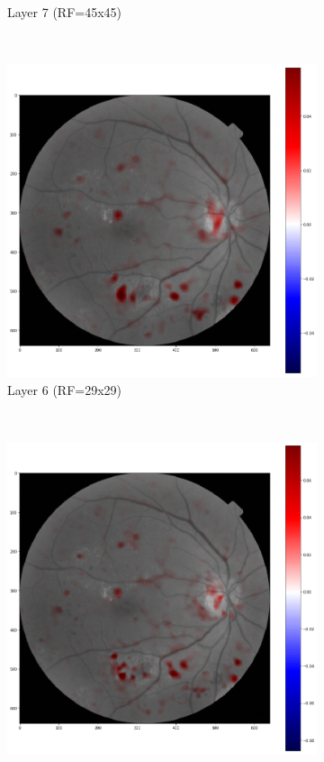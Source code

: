 \documentclass[review]{elsarticle}
\theoremstyle{definition} %
\theoremstyle{remark}
\begin{document}
\begin{figure}[!ht]
\begin{subfigure}{0.45\textwidth}
		\caption{Layer 7 (RF=45x45)}
		\label{fig:score_rf45}
	\end{subfigure}\\
	\begin{subfigure}{0.45\textwidth}
		\includegraphics[width=\textwidth]{./figures/maps/rf29c.png}
		\caption{Layer 6 (RF=29x29)}
		\label{fig:score_rf29}
	\end{subfigure}
	~ %
	\begin{subfigure}{0.45\textwidth}
		\includegraphics[width=\textwidth]{./figures/maps/rf21c.png}

\end{subfigure}
\end{figure}
\end{document}
